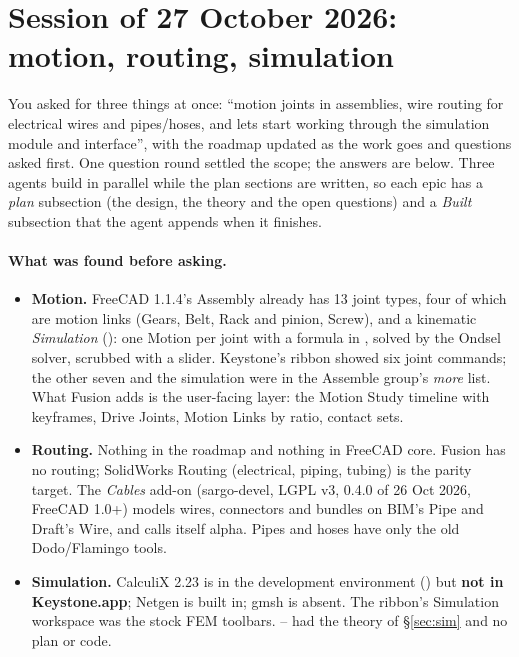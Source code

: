 \section{Session of 27 October 2026: motion, routing, simulation}\label{sec:session-27oct}

You asked for three things at once: ``motion joints in assemblies, wire routing for electrical wires and
pipes/hoses, and lets start working through the simulation module and interface'', with the roadmap updated as
the work goes and questions asked first. One question round settled the scope; the answers are below. Three
agents build in parallel while the plan sections are written, so each epic has a \emph{plan} subsection (the
design, the theory and the open questions) and a \emph{Built} subsection that the agent appends when it finishes.

\paragraph{What was found before asking.}
\begin{itemize}
  \item \textbf{Motion.} FreeCAD 1.1.4's Assembly already has 13 joint types, four of which are motion links
        (Gears, Belt, Rack and pinion, Screw), and a kinematic \emph{Simulation} ():
        one Motion per joint with a formula in , solved by the Ondsel solver, scrubbed with a slider.
        Keystone's ribbon showed six joint commands; the other seven and the simulation were in the Assemble
        group's \emph{more} list. What Fusion adds is the user-facing layer: the Motion Study timeline with
        keyframes, Drive Joints, Motion Links by ratio, contact sets.
  \item \textbf{Routing.} Nothing in the roadmap and nothing in FreeCAD core. Fusion has no routing; SolidWorks
        Routing (electrical, piping, tubing) is the parity target. The \emph{Cables} add-on (sargo-devel, LGPL v3,
        0.4.0 of 26 Oct 2026, FreeCAD 1.0+) models wires, connectors and bundles on BIM's Pipe and Draft's Wire,
        and calls itself alpha. Pipes and hoses have only the old Dodo/Flamingo tools.
  \item \textbf{Simulation.} CalculiX 2.23 is in the development environment () but
        \textbf{not in Keystone.app}; Netgen is built in; gmsh is absent. The ribbon's Simulation workspace was the
        stock FEM toolbars. -- had the theory of \S\ref{sec:sim} and no plan or code.
\end{itemize}

